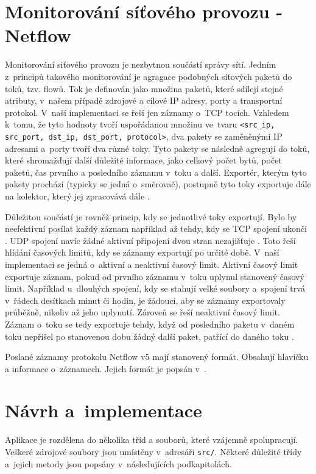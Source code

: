 \documentclass[a4paper, 11pt]{article}
\begin{document}
\begin{sloppypar}
\section{Monitorování síťového provozu - Netflow}
Monitorování siťového provozu je nezbytnou součástí správy sítí. Jedním z~principů takového monitorování je agragace podobných síťových paketů do toků, tzv. flowů. Tok je definován jako množina paketů, které sdílejí stejné atributy, v~našem případě zdrojové a cílové IP adresy, porty a transportní protokol. V~naší implementaci se řeší jen záznamy o~TCP tocích. Vzhledem k~tomu, že tyto hodnoty tvoří uspořádanou množinu ve~tvaru \texttt{<src\_ip, src\_port, dst\_ip, dst\_port, protocol>}, dva pakety se zaměněnými IP adresami a~porty tvoří dva různé toky. Tyto pakety se následně agregují do toků, které shromažďují další důležité informace, jako celkový počet bytů, počet paketů, čas prvního a posledního záznamu v~toku a další. Exportér, kterým tyto pakety prochází (typicky se jedná o~směrovač), postupně tyto toky exportuje dále na kolektor, který jej zpracovává dále \cite{flows}.

Důležitou součástí je rovněž princip, kdy se jednotlivé toky exportují. Bylo by neefektivní posílat každý záznam například až tehdy, kdy se TCP spojení ukončí \cite{TCP}. UDP spojení navíc žádné aktivní připojení dvou stran nezajišťuje \cite{UDP}. Toto řeší hlídání časových limitů, kdy se záznamy exportují po určité době. V~naší implementaci se jedná o~aktivní a neaktivní časový limit. Aktivní časový limit exportuje záznam, pokud od prvního záznamu v~toku uplynul stanovený časový limit. Například u~dlouhých spojení, kdy se stahují velké soubory a~spojení trvá v~řádech desítkach minut či hodin, je žádoucí, aby se záznamy exportovaly průběžně, nikoliv až jeho uplynutí. Zároveň se řeší neaktivní časový limit. Záznam o~toku se tedy exportuje tehdy, když od posledního paketu v~daném toku nepřišel po stanovenou dobu žádný další paket, patřící do daného toku \cite{flows}.

Poslané záznamy protokolu Netflow v5 mají stanovený formát. Obsahují hlavičku a informace o~záznamech. Jejich formát je popsán v~\cite{netflow5}.

\section{Návrh a~implementace}

Aplikace je rozdělena do několika tříd a souborů, které vzájemně spolupracují. Veškeré zdrojové soubory jsou umístěny v~adresáři \texttt{src/}. Některé důležité třídy a~jejich metody jsou popsány v~následujících podkapitolách.

\end{sloppypar}
\end{document}
